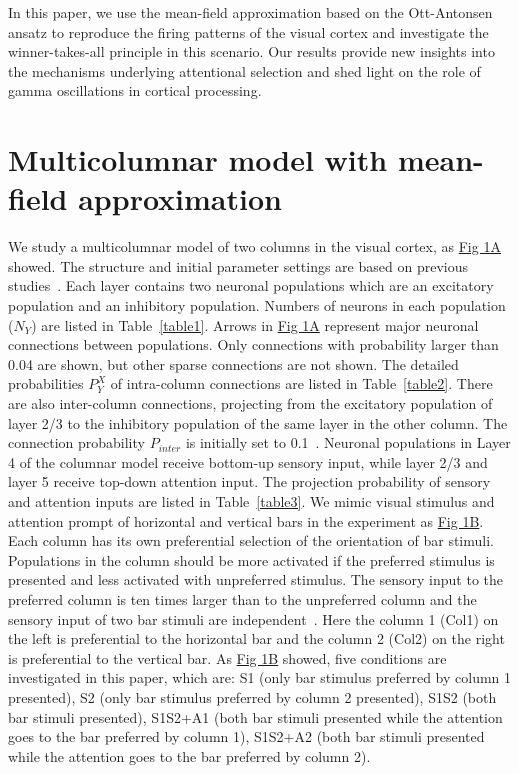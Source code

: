 \documentclass[10pt,letterpaper]{article}
\begin{document}
In this paper, we use the mean-field approximation based on the Ott-Antonsen ansatz to reproduce the firing patterns of the visual cortex and investigate the winner-takes-all principle in this scenario. Our results provide new insights into the mechanisms underlying attentional selection and shed light on the role of gamma oscillations in cortical processing.




\section*{Multicolumnar model with mean-field approximation}
We study a multicolumnar model of two columns in the visual cortex, as \hyperlink{fig:fig1}{Fig 1A} showed. The structure and initial parameter settings are based on previous studies~\cite{bib1}. Each layer contains two neuronal populations which are an excitatory population and an inhibitory population. Numbers of neurons in each population ($N_{Y}$) are listed in Table~\ref{table1}. Arrows in \hyperlink{fig:fig1}{Fig 1A} represent major neuronal connections between populations. Only connections with probability larger than 0.04 are shown, but other sparse connections are not shown. The detailed probabilities $P_{Y}^{X}$ of intra-column connections are listed in Table~\ref{table2}. There are also inter-column connections, projecting from the excitatory population of layer 2/3 to the inhibitory population of the same layer in the other column. The connection probability $P_{inter}$ is initially set to 0.1~\cite{bib1}. Neuronal populations in Layer 4 of the columnar model receive bottom-up sensory input, while layer 2/3 and layer 5 receive top-down attention input. The projection probability of sensory and attention inputs are listed in Table~\ref{table3}. We mimic visual stimulus and attention prompt of horizontal and vertical bars in the experiment as \hyperlink{fig:fig1}{Fig 1B}. Each column has its own preferential selection of the orientation of bar stimuli. Populations in the column should be more activated if the preferred stimulus is presented and less activated with unpreferred stimulus. The sensory input to the preferred column is ten times larger than to the unpreferred column and the sensory input of two bar stimuli are independent~\cite{bib1}. Here the column 1 (Col1) on the left is preferential to the horizontal bar and the column 2 (Col2) on the right is preferential to the vertical bar. As \hyperlink{fig:fig1}{Fig 1B} showed, five conditions are investigated in this paper, which are: S1 (only bar stimulus preferred by column 1 presented), S2 (only bar stimulus preferred by column 2 presented), S1S2 (both bar stimuli presented), S1S2+A1 (both bar stimuli presented while the attention goes to the bar preferred by column 1), S1S2+A2 (both bar stimuli presented while the attention goes to the bar preferred by column 2).
\end{document}
